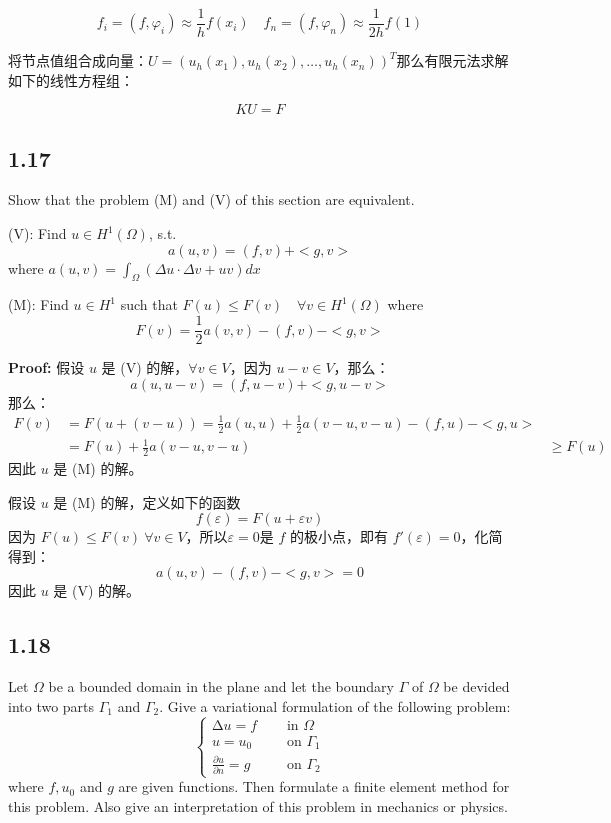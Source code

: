 \documentclass[UTF8]{ctexart}
\begin{document}
\[f_{i} = \left( f,\varphi_{i} \right) \approx \frac{1}{h}f\left( x_{i} \right)\quad f_{n} = \left( f,\varphi_{n} \right) \approx \frac{1}{2h}f(1)\]

将节点值组合成向量：\(U = \left( u_{h}\left( x_{1} \right),u_{h}\left( x_{2} \right),\ldots,u_{h}\left( x_{n} \right) \right)^{T}\)那么有限元法求解如下的线性方程组：

\[KU = F\]

\subsection{1.17}

Show that the problem (M) and (V) of this section are equivalent.

(V): Find \(u \in H^{1}(\Omega)\), s.t. \[a(u,v) = (f,v) + < g,v >\]
where \(a(u,v) = \int_{\Omega}(\Delta u \cdot \Delta v + uv)dx\)

(M): Find \(u \in H^{1}\) such that
\(F(u) \leq F(v)\quad\forall v \in H^{1}(\Omega)\) where
\[F(v) = \frac{1}{2}a(v,v) - (f,v) - < g,v >\]

\textbf{Proof: } 假设 \(u\) 是 (V) 的解，\(\forall v \in V\)，因为
\(u - v \in V\)，那么： \[a(u,u - v) = (f,u - v) + < g,u - v >\] 那么：
\[\begin{array}{rlr}
F(v) & = F\left( u + (v - u) \right) = \frac{1}{2}a(u,u) + \frac{1}{2}a(v - u,v - u) - (f,u) - < g,u > \\
 & = F(u) + \frac{1}{2}a(v - u,v - u) & \geq F(u)
\end{array}\] 因此 \(u\) 是 (M) 的解。

假设 \(u\) 是 (M) 的解，定义如下的函数
\[f(\varepsilon) = F(u + \varepsilon v)\] 因为
\(F(u) \leq F(v)\ \forall v \in V\)，所以\(\varepsilon = 0\)是 \(f\)
的极小点，即有 \(f\prime(\varepsilon) = 0\)，化简得到：
\[a(u,v) - (f,v) - < g,v > = 0\] 因此 \(u\) 是 (V) 的解。

\subsection{1.18}

Let \(\Omega\) be a bounded domain in the plane and let the boundary
\(\Gamma\) of \(\Omega\) be devided into two parts \(\Gamma_{1}\) and
\(\Gamma_{2}\). Give a variational formulation of the following problem:
\[\begin{cases}
\mathrm{\Delta}u = f & \quad\text{ in }\Omega \\
u = u_{0} & \quad\text{ on }\Gamma_{1} \\
\frac{\partial u}{\partial n} = g & \quad\text{ on }\Gamma_{2}
\end{cases}\] where \(f,u_{0}\) and \(g\) are given functions. Then
formulate a finite element method for this problem. Also give an
interpretation of this problem in mechanics or physics.
\end{document}
